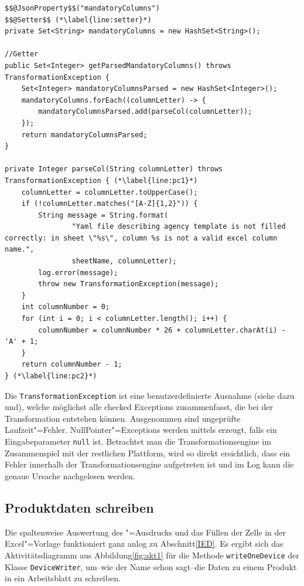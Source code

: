 \begin{lstlisting}[emph={mandatoryColumns, columnLetter, mandatoryColumnsParsed, message, columnNumber, sheetName, log},
caption=Setter / Getter für verbindliche Spalten in \texttt{SheetMapping}, label=code:sgcol]
$$@JsonProperty$$("mandatoryColumns")
$$@Setter$$ (*\label{line:setter}*)
private Set<String> mandatoryColumns = new HashSet<String>();

//Getter
public Set<Integer> getParsedMandatoryColumns() throws TransformationException {
	Set<Integer> mandatoryColumnsParsed = new HashSet<Integer>();
	mandatoryColumns.forEach((columnLetter) -> {
		mandatoryColumnsParsed.add(parseCol(columnLetter));
	});
	return mandatoryColumnsParsed;
}

private Integer parseCol(String columnLetter) throws TransformationException { (*\label{line:pc1}*)
	columnLetter = columnLetter.toUpperCase();
	if (!columnLetter.matches("[A-Z]{1,2}")) {
		String message = String.format(
				"Yaml file describing agency template is not filled correctly: in sheet \"%s\", column %s is not a valid excel column name.",
				sheetName, columnLetter);
		log.error(message);
		throw new TransformationException(message);
	}
	int columnNumber = 0;
	for (int i = 0; i < columnLetter.length(); i++) {
		columnNumber = columnNumber * 26 + columnLetter.charAt(i) - 'A' + 1;
	}
	return columnNumber - 1;
} (*\label{line:pc2}*)
\end{lstlisting}
Die \texttt{TransformationException} ist eine benutzerdefinierte Ausnahme (siehe dazu\nbs\cite[S.\,32f]{java:lifesci} und\nbs\cite[S.\,309--338]{java:tut}), welche möglichst alle checked Exceptions zusammenfasst, die bei der Transformation entstehen können. Ausgenommen sind ungeprüfte Laufzeit"=Fehler. NullPointer"=Exceptions werden mittels  erzeugt, falls ein Eingabeparameter \texttt{null} ist. Betrachtet man die Transformationsengine im Zusammenspiel mit der restlichen Plattform, wird so direkt ersichtlich, dass ein Fehler innerhalb der Transformationsengine aufgetreten ist und im Log kann die genaue Ursache nachgelesen werden. 

\subsection{Produktdaten schreiben}\label{WOD}
Die spaltenweise Auswertung des "=Ausdrucks und das Füllen der Zelle in der Excel"=Vorlage funktioniert ganz anlog zu Abschnitt\nbs\ref{IED}. Es ergibt sich das Aktivitätsdiagramm aus Abbildung\nbs\ref{fig:akt1} für die Methode \texttt{writeOneDevice} der Klasse \texttt{DeviceWriter}, um\nbs --\nbs wie der Name schon sagt\nbs --\nbs die Daten zu einem Produkt in ein Arbeitsblatt zu schreiben. 

